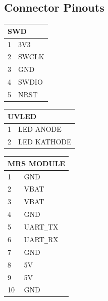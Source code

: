 \documentclass[12pt, a4paper]{article}
\begin{document}
\subsection{Connector Pinouts}
\begin{center}
\begin{minipage}[t][3cm][t]{0.24\textwidth}
\centering
\begin{tabular}{|l|l|}
\hline
\multicolumn{2}{|p{2cm}|}{\centering\textbf{SWD}} \\ \hline
1               & 3V3               \\ \hline
2               & SWCLK             \\ \hline
3               & GND               \\ \hline
4               & SWDIO             \\ \hline
5               & NRST              \\ \hline
\end{tabular}
\hfill
\end{minipage}
\begin{minipage}[t][3cm][t]{0.24\textwidth}
\centering
\begin{tabular}{|l|l|}
\hline
\multicolumn{2}{|p{2cm}|}{\centering\textbf{UVLED}} \\ \hline
1               & LED ANODE                \\ \hline
2               & LED KATHODE                \\ \hline
\end{tabular}
\end{minipage}
\begin{minipage}[t][3.5cm][t]{0.24\textwidth}
\centering
\begin{tabular}{|l|l|}
\hline
\multicolumn{2}{|p{3cm}|}{\centering\textbf{MRS MODULE}} \\ \hline
1               & GND         \\ \hline
2               & VBAT        \\ \hline
3               & VBAT        \\ \hline
4               & GND         \\ \hline
5               & UART\verb|_|TX     \\ \hline
6               & UART\verb|_|RX     \\ \hline
7               & GND         \\ \hline
8               & 5V          \\ \hline
9               & 5V          \\ \hline
10              & GND         \\ \hline
\end{tabular}
\end{minipage}
\end{center}
\end{document}
